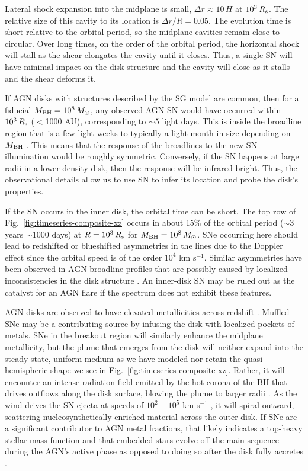 Lateral shock expansion into the midplane is small, $\Delta r\approx 10\,H$ at $10^3\,R_{\rm s}$.
The relative size of this cavity to its location is $\Delta r/R = 0.05$.
The evolution time is short relative to the orbital period, so the midplane cavities remain close to circular.
Over long times, on the order of the orbital period, the horizontal shock will stall as the shear elongates the cavity until it closes.
Thus, a single SN will have minimal impact on the disk structure and the cavity will close as it stalls and the shear deforms it.

If AGN disks with structures described by the SG model are common, then for a fiducial $M_{\rm BH}=10^8\,M_{\odot}$, any observed AGN-SN would have occurred within $10^3\,R_{\rm s}$ ($<$1000 AU), corresponding to $\sim5$ light days.
This is inside the broadline region that is a few light weeks to typically a light month in size depending on $M_{\rm BH}$ \citep{BlandfordMcKee82}.
This means that the response of the broadlines to the new SN illumination would be roughly symmetric.
Conversely, if the SN happens at large radii in a lower density disk, then the response will be infrared-bright.
Thus, the observational details allow us to use SN to infer its location and probe the disk's properties.

If the SN occurs in the inner disk, the orbital time can be short.
The top row of Fig.~\ref{fig:timeseries-composite-xz} occurs in about 15\% of the orbital period ($\sim3$ years $\sim1000$ days) at $R=10^3\,R_{\rm s}$ for $M_{\rm BH}=10^8\,M_{\odot}$.
SNe occurring here should lead to redshifted or blueshifted asymmetries in the lines due to the Doppler effect since the orbital speed is of the order $10^4$ km s$^{-1}$.
Similar asymmetries have been observed in AGN broadline profiles that are possibly caused by localized inconsistencies in the disk structure \citep[e.g., spiral arms,][]{Schimoia+17}.
An inner-disk SN may be ruled out as the catalyst for an AGN flare if the spectrum does not exhibit these features.

AGN disks are observed to have elevated metallicities across redshift \citep{Dors+14,Onoue+2020}.
Muffled SNe may be a contributing source by infusing the disk with localized pockets of metals.
SNe in the breakout region will similarly enhance the midplane metallicity, but the plume that emerges from the disk will neither expand into the steady-state, uniform medium as we have modeled nor retain the quasi-hemispheric shape we see in Fig.~\ref{fig:timeseries-composite-xz}.
Rather, it will encounter an intense radiation field emitted by the hot corona of the BH that drives outflows along the disk surface, blowing the plume to larger radii \citep{CrenshawKraemerGeorge03,ProgaKallman04}.
As the wind drives the SN ejecta at speeds of $10^2-10^5$ km s$^{-1}$ \citep{Parker+17,Mehdipour+17}, it will spiral outward, scattering nucleosynthetically enriched material across the outer disk.
If SNe are a significant contributor to AGN metal fractions, that likely indicates a top-heavy stellar mass function \citep{FanWu23} and that embedded stars evolve off the main sequence during the AGN's active phase \citep{HuangLinShields23} as opposed to doing so after the disk fully accretes \citep{CantielloJermynLin21}.

